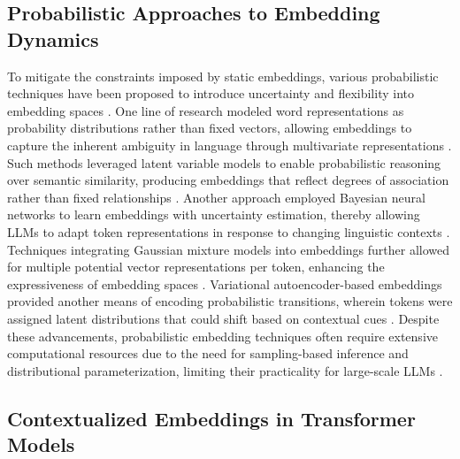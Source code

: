 \subsection{Probabilistic Approaches to Embedding Dynamics}

To mitigate the constraints imposed by static embeddings, various probabilistic techniques have been proposed to introduce uncertainty and flexibility into embedding spaces \cite{roova2024exploring}. One line of research modeled word representations as probability distributions rather than fixed vectors, allowing embeddings to capture the inherent ambiguity in language through multivariate representations \cite{rikitoshi2024automated}. Such methods leveraged latent variable models to enable probabilistic reasoning over semantic similarity, producing embeddings that reflect degrees of association rather than fixed relationships \cite{watanabe2024empower}. Another approach employed Bayesian neural networks to learn embeddings with uncertainty estimation, thereby allowing LLMs to adapt token representations in response to changing linguistic contexts \cite{zakiev2024emergent}. Techniques integrating Gaussian mixture models into embeddings further allowed for multiple potential vector representations per token, enhancing the expressiveness of embedding spaces \cite{vitiello2024context}. Variational autoencoder-based embeddings provided another means of encoding probabilistic transitions, wherein tokens were assigned latent distributions that could shift based on contextual cues \cite{mcintosh2023culturally}. Despite these advancements, probabilistic embedding techniques often require extensive computational resources due to the need for sampling-based inference and distributional parameterization, limiting their practicality for large-scale LLMs \cite{hou2024benchmarking}.

\subsection{Contextualized Embeddings in Transformer Models}


